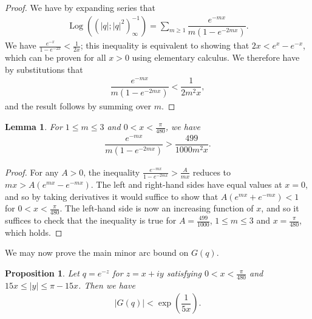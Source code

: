 \documentclass[11pt,reqno]{amsart}
\theoremstyle{definition}
\theoremstyle{plain}
\newtheorem{lemma}[theorem]{Lemma}
\newtheorem{prop}[theorem]{Proposition}
\theoremstyle{named}
\DeclareMathOperator\Log{Log}
\numberwithin{equation}{section}
\theoremstyle{example}
\def\lp{\left(}
\def\rp{\right)}
\begin{document}
\begin{proof}
We have by expanding series that
\begin{align*}
	\Log\lp \lp |q|; |q|^2 \rp_\infty^{-1} \rp = \sum_{m \geq 1} \dfrac{e^{-mx}}{m\lp 1 - e^{-2mx} \rp}.
\end{align*}
We have $\frac{e^{-x}}{1 - e^{-2x}} < \frac{1}{2x}$; this inequality is equivalent to showing that $2x < e^x - e^{-x}$, which can be proven for all $x > 0$ using elementary calculus. We therefore have by substitutions that
\begin{align*}
	\dfrac{e^{-mx}}{m\lp 1 - e^{-2mx} \rp} < \dfrac{1}{2m^2 x},
\end{align*}
and the result follows by summing over $m$.
\end{proof}

\begin{lemma} \label{Elementary Bounds}
For $1 \leq m \leq 3$ and $0 < x < \frac{\pi}{480}$, we have
\begin{align*}
	\dfrac{e^{-mx}}{m\lp 1 - e^{-2mx}\rp} > \dfrac{499}{1000 m^2 x}.
\end{align*}
\end{lemma}

\begin{proof}
For any $A>0$, the inequality $\frac{e^{-mx}}{1 - e^{-2mx}} > \frac{A}{mx}$ reduces to $mx > A\lp e^{mx} - e^{-mx} \rp$. The left and right-hand sides have equal values at $x=0$, and so by taking derivatives it would suffice to show that $A\lp e^{mx} + e^{-mx} \rp < 1$ for $0 < x < \frac{\pi}{480}$. The left-hand side is now an increasing function of $x$, and so it suffices to check that the inequality is true for $A = \frac{499}{1000}$, $1 \leq m \leq 3$ and $x = \frac{\pi}{480}$, which holds.
\end{proof}

We may now prove the main minor arc bound on $G(q)$.

\begin{prop} \label{Minor Arc Bounds}
Let $q = e^{-z}$ for $z = x + iy$ satisfying $0 < x < \frac{\pi}{480}$ and $15x \leq |y| \leq \pi - 15x$. Then we have
\begin{align*}
    \left| G\lp q \rp \right| < \exp\lp \dfrac{1}{5 x} \rp.
\end{align*}
\end{prop}
\end{document}
